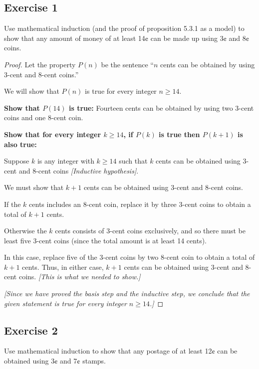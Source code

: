 \documentclass[14pt]{extarticle}
\begin{document}
\subsection{Exercise 1}
Use mathematical induction (and the proof of proposition 5.3.1 as a model) to show that any amount of money of at least 14¢ can be made up using 3¢ and 8¢ coins.

\begin{proof}
Let the property $P(n)$ be the sentence “$n$ cents can be obtained by using 3-cent and 8-cent coins.” 

We will show that $P(n)$ is true for every integer $n \geq 14$. 

{\bf Show that $P(14)$ is true:} Fourteen cents can be obtained by using two 3-cent coins and one 8-cent coin.

{\bf Show that for every integer $k \geq 14$, if $P(k)$ is true then $P(k + 1)$ is also true:} 

Suppose $k$ is any integer with $k \geq 14$ such that $k$ cents can be obtained using 3-cent and 8-cent coins {\it [Inductive hypothesis]}. 

We must show that $k + 1$ cents can be obtained using 3-cent and 8-cent coins. 

If the $k$ cents includes an 8-cent coin, replace it by three 3-cent coins to obtain a total of $k + 1$ cents. 

Otherwise the $k$ cents consists of 3-cent coins exclusively, and so there must be least five 3-cent coins (since the total amount is at least 14 cents). 

In this case, replace five of the 3-cent coins by two 8-cent coin to obtain a total of $k + 1$ cents. Thus, in either case, $k + 1$ cents can be obtained using 3-cent and 8-cent coins. {\it [This is what we needed to show.]}

{\it [Since we have proved the basis step and the inductive step, we conclude that the given statement is true for every integer $n \geq 14$.]}
\end{proof}

\subsection{Exercise 2}
Use mathematical induction to show that any postage of at least 12¢ can be obtained using 3¢ and 7¢ stamps.
\end{document}
